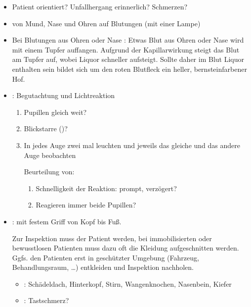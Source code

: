 {%
\begin{itemize}
  \item Patient orientiert? Unfallhergang erinnerlich? Schmerzen?
  \item {} von Mund, Nase und Ohren auf Blutungen 
  (mit einer Lampe)
  \item Bei Blutungen aus Ohren oder Nase
  \label{topic:tupfertest}:
  Etwas Blut aus Ohren oder Nase wird mit einem Tupfer auffangen.
  Aufgrund der Kapillarwirkung steigt das Blut am Tupfer auf, wobei Liquor schneller aufsteigt.
  Sollte daher im Blut Liquor enthalten sein 
  bildet sich um den roten Blutfleck ein heller, bernsteinfarbener Hof.  
  \item {}: Begutachtung und Lichtreaktion
    \begin{enumerate}
      \item Pupillen gleich weit?
      \item Blickstarre ()? 
      \item {} In jedes Auge zwei mal leuchten
      und jeweils das gleiche und das andere Auge beobachten
      
      Beurteilung von:
      \begin{enumerate}
        \item Schnelligkeit der Reaktion: prompt, verzögert?
        \item Reagieren immer beide
        Pupillen?~
      \end{enumerate}
    \end{enumerate}
  \item {}:  
  mit festem Griff von Kopf bis Fuß. 
  
  Zur Inspektion muss der Patient  werden, 
  bei immobilisierten oder bewusstlosen Patienten muss 
  dazu oft die Kleidung aufgeschnitten werden. 
   Ggfs. den Patienten erst in 
  geschützter Umgebung (Fahrzeug, Behandlungsraum, \ldots) 
  entkleiden und Inspektion nachholen. 
  \begin{itemize}
    \item {}: Schädeldach, Hinterkopf,
    Stirn, Wangenknochen, Nasenbein, Kiefer
    \item {}:  
    Tastschmerz? 
    

\end{itemize}
\end{itemize}}
